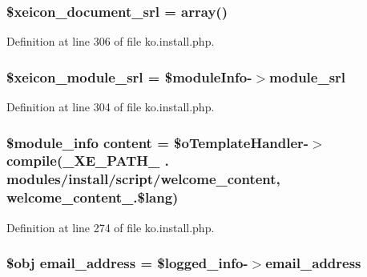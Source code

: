 \subsubsection[{\$xeicon\+\_\+document\+\_\+srl}]{\setlength{\rightskip}{0pt plus 5cm}\$xeicon\+\_\+document\+\_\+srl = array()}\label{ko_8install_8php_a41d95a71ebf0758e83224ab4bb3a31c0}


Definition at line 306 of file ko.\+install.\+php.

\hypertarget{ko_8install_8php_acf278a9931e1d1ea52b045c0fa42b9b3}{}
\subsubsection[{\$xeicon\+\_\+module\+\_\+srl}]{\setlength{\rightskip}{0pt plus 5cm}\$xeicon\+\_\+module\+\_\+srl = \$module\+Info-\/$>${\bf module\+\_\+srl}}\label{ko_8install_8php_acf278a9931e1d1ea52b045c0fa42b9b3}


Definition at line 304 of file ko.\+install.\+php.

\hypertarget{ko_8install_8php_a65dddc3e5e47cb506e6b5417ffb3bdef}{}
\subsubsection[{content}]{\setlength{\rightskip}{0pt plus 5cm}\$module\+\_\+info {\bf content} = \$o\+Template\+Handler-\/$>$compile({\bf \+\_\+\+X\+E\+\_\+\+P\+A\+T\+H\+\_\+} . \textquotesingle{}modules/{\bf install}/script/welcome\+\_\+content\textquotesingle{}, \textquotesingle{}welcome\+\_\+content\+\_\+\textquotesingle{}.\$lang)}\label{ko_8install_8php_a65dddc3e5e47cb506e6b5417ffb3bdef}


Definition at line 274 of file ko.\+install.\+php.

\hypertarget{ko_8install_8php_a1dffea0d5ba8194f8ef01f414af0c831}{}
\subsubsection[{email\+\_\+address}]{\setlength{\rightskip}{0pt plus 5cm}\$obj email\+\_\+address = \$logged\+\_\+info-\/$>$email\+\_\+address}\label{ko_8install_8php_a1dffea0d5ba8194f8ef01f414af0c831}


